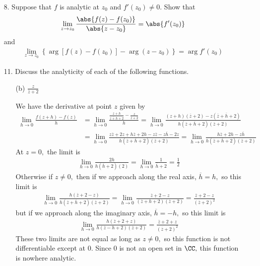 \documentclass{article}
\begin{document}
\begin{itemize}
	\item[8.] Suppose that $f$ is analytic at $z_0$ and $f'(z_0)\neq 0.$ Show that
		\begin{align*}
			\lim_{z\to z_0} \frac{\abs{f(z)-f(z_0)}}{\abs{z-z_0}} = \abs{f'(z_0)}
		\end{align*}
		and
		\begin{align*}
			\lim_{z\to z_0} \left\{ \arg\left[ f(z)-f(z_0) \right]-\arg(z-z_0) \right\} = \arg f'(z_0)
		\end{align*}

	\item[11.] Discuss the analyticity of each of the following functions.
		\begin{itemize}
			\item[(b)] $\frac{z}{\overline z+2}$
				\begin{soln}
					We have the derivative at point $z$ given by
					\begin{align*}
						\lim_{h\to 0}\frac{f(z+h)-f(z)}{h} &= \lim_{h\to 0} \frac{\frac{z+h}{\overline{z+h}+2} - \frac{z}{\overline z + 2}}{h} = \lim_{h\to 0} \frac{(z+h)(\overline z + 2) - z(\overline z+\overline h + 2)}{h(\overline z+\overline h + 2)(\overline z + 2)} \\
						&= \lim_{h\to 0} \frac{z\overline z + 2z +h\overline z + 2h - z\overline z - z\overline h - 2z}{h(\overline z + \overline h + 2)(\overline z + 2)} = \lim_{h\to 0} \frac{h\overline z + 2h - z\overline h}{h(\overline z + \overline h + 2)(\overline z + 2)}
					\end{align*}
					At $z=0,$ the limit is
					\begin{align*}
						\lim_{h\to 0} \frac{2h}{h(\overline h+2)(2)} = \lim_{h\to 0} \frac{1}{\overline h + 2} = \frac{1}{2}
					\end{align*}
					Otherwise if $z\neq 0,$ then if we approach along the real axis, $\overline h=h,$ so this limit is
					\begin{align*}
						\lim_{h\to 0} \frac{h(\overline z + 2 - z)}{h(\overline z + \overline h + 2)(\overline z + 2)} = \lim_{h\to 0} \frac{\overline z + 2 - z}{(\overline z + h + 2)(\overline z + 2)} = \frac{\overline z + 2 - z}{(\overline z+2)^2}
					\end{align*}
					but if we approach along the imaginary axis, $\overline h = -h,$ so this limit is
					\begin{align*}
						\lim_{h\to 0}\frac{h(\overline z + 2+ z)}{h(\overline z - h + 2)(\overline z + 2)} = \frac{\overline z + 2 + z}{(\overline z+2)^2}
					\end{align*}
					These two limits are not equal as long as $z\neq 0,$ so this function is not differentiable except at 0. Since 0 is not an open set in $\CC,$ this function is nowhere analytic.
				\end{soln}


\end{itemize}
\end{itemize}
\end{document}
